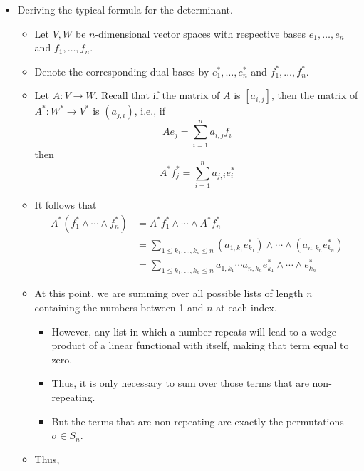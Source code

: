 \documentclass[../notes.tex]{subfiles}
\begin{document}
\begin{itemize}
\begin{proof}
\begin{equation*}
            A^*\omega = B^*i_W^*\omega
        \end{equation*}
        where $i_W^*\omega=0$ as an element of $\lam[n]{W^*}$.
    \end{proof}
    \item Deriving the typical formula for the determinant.
    \begin{itemize}
        \item Let $V,W$ be $n$-dimensional vector spaces with respective bases $e_1,\dots,e_n$ and $f_1,\dots,f_n$.
        \item Denote the corresponding dual bases by $e_1^*,\dots,e_n^*$ and $f_1^*,\dots,f_n^*$.
        \item Let $A:V\to W$. Recall that if the matrix of $A$ is $[a_{i,j}]$, then the matrix of $A^*:W^*\to V^*$ is $(a_{j,i})$, i.e., if
        \begin{equation*}
            Ae_j = \sum_{i=1}^na_{i,j}f_i
        \end{equation*}
        then
        \begin{equation*}
            A^*f_j^* = \sum_{i=1}^na_{j,i}e_i^*
        \end{equation*}
        \item It follows that
        \begin{align*}
            A^*(f_1^*\wedge\cdots\wedge f_n^*) &= A^*f_1^*\wedge\cdots\wedge A^*f_n^*\\
            &= \sum_{1\leq k_1,\dots,k_n\leq n}(a_{1,k_1}e_{k_1}^*)\wedge\cdots\wedge(a_{n,k_n}e_{k_n}^*)\\
            &= \sum_{1\leq k_1,\dots,k_n\leq n}a_{1,k_1}\cdots a_{n,k_n}e_{k_1}^*\wedge\cdots\wedge e_{k_n}^*
        \end{align*}
        \item At this point, we are summing over all possible lists of length $n$ containing the numbers between 1 and $n$ at each index.
        \begin{itemize}
            \item However, any list in which a number repeats will lead to a wedge product of a linear functional with itself, making that term equal to zero.
            \item Thus, it is only necessary to sum over those terms that are non-repeating.
            \item But the terms that are non repeating are exactly the permutations $\sigma\in S_n$.
        \end{itemize}
        \item Thus,

\end{itemize}
\end{itemize}
\end{document}
